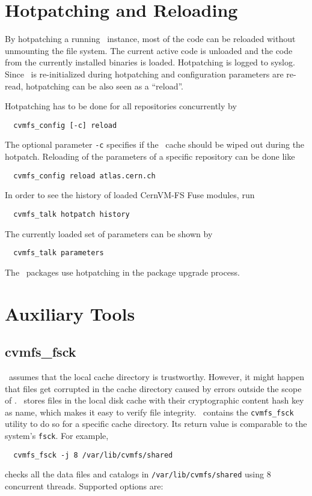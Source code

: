 \section{Hotpatching and Reloading}
\label{sct:hotpatch}

By hotpatching a running \cvmfs\ instance, most of the code can be reloaded without unmounting the file system.
The current active code is unloaded and the code from the currently installed binaries is loaded.
Hotpatching is logged to syslog.
Since \cvmfs\ is re-initialized during hotpatching and configuration parameters are re-read, hotpatching can be also seen as a ``reload''.

Hotpatching has to be done for all repositories concurrently by
\begin{verbatim}
  cvmfs_config [-c] reload
\end{verbatim}
The optional parameter \texttt{-c} specifies if the \cvmfs\ cache should be wiped out during the hotpatch.
Reloading of the parameters of a specific repository can be done like
\begin{verbatim}
  cvmfs_config reload atlas.cern.ch
\end{verbatim}
In order to see the history of loaded CernVM-FS Fuse modules, run
\begin{verbatim}
  cvmfs_talk hotpatch history
\end{verbatim}
The currently loaded set of parameters can be shown by
\begin{verbatim}
  cvmfs_talk parameters
\end{verbatim}
The \cvmfs\ packages use hotpatching in the package upgrade process.


\section{Auxiliary Tools}
\label{sct:tools}

\subsection{cvmfs\_fsck}
\cvmfs\ assumes that the local cache directory is trustworthy.
However, it might happen that files get corrupted in the cache directory caused by errors outside the scope of \cvmfs.
\cvmfs\ stores files in the local disk cache with their cryptographic content hash key as name, which makes it easy to verify file integrity.
\cvmfs\ contains the \texttt{cvmfs\_fsck} utility to do so for a specific cache directory. 
Its return value is comparable to the system's \texttt{fsck}.
For example,
\begin{verbatim}
  cvmfs_fsck -j 8 /var/lib/cvmfs/shared
\end{verbatim}
checks all the data files and catalogs in \texttt{/var/lib/cvmfs/shared} using 8 concurrent threads.  
Supported options are:


